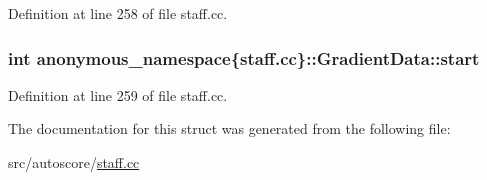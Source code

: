 Definition at line 258 of file staff.\+cc.

\subsubsection[{\texorpdfstring{start}{start}}]{\setlength{\rightskip}{0pt plus 5cm}int anonymous\+\_\+namespace\{staff.\+cc\}\+::Gradient\+Data\+::start}\hypertarget{structanonymous__namespace_02staff_8cc_03_1_1GradientData_a3a79d49613666ff291eefbb3acf6bc07}{}\label{structanonymous__namespace_02staff_8cc_03_1_1GradientData_a3a79d49613666ff291eefbb3acf6bc07}


Definition at line 259 of file staff.\+cc.



The documentation for this struct was generated from the following file\+:\begin{DoxyCompactItemize}
\item 
src/autoscore/\hyperlink{staff_8cc}{staff.\+cc}\end{DoxyCompactItemize}
